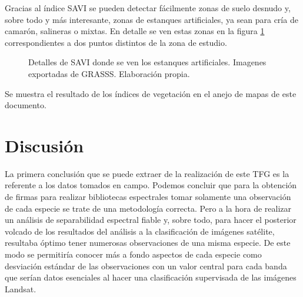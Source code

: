 Gracias al índice \ac{SAVI} se pueden detectar fácilmente zonas de suelo desnudo y, sobre todo y más interesante, zonas de estanques artificiales, ya sean para cría de camarón, salineras o mixtas. En detalle se ven estas zonas en la figura \ref{fig:detalle_estanques} correspondientes a dos puntos distintos de la zona de estudio.%

\begin{figure}
	\centering
	\caption[Detalle de estanques en SAVI]{Detalles de SAVI donde se ven los estanques artificiales. Imagenes exportadas de GRASSS. Elaboración propia.}
	\label{fig:detalle_estanques}
\end{figure}

Se muestra el resultado de los índices de vegetación en el anejo de mapas de este documento.

\section{Discusión}

La primera conclusión que se puede extraer de la realización de este \ac{TFG} es la referente a los datos tomados en campo. Podemos concluir que para la obtención de firmas para realizar bibliotecas espectrales tomar solamente una observación de cada especie se trate de una metodología correcta. Pero a la hora de realizar un análisis de separabilidad espectral fiable y, sobre todo, para hacer el posterior volcado de los resultados del análisis a la clasificación de imágenes satélite, resultaba óptimo tener numerosas observaciones de una misma especie. De este modo se permitiría conocer más a fondo aspectos de cada especie como desviación estándar de las observaciones con un valor central para cada banda que serían datos esenciales al hacer una clasificación supervisada de las imágenes Landsat.%

